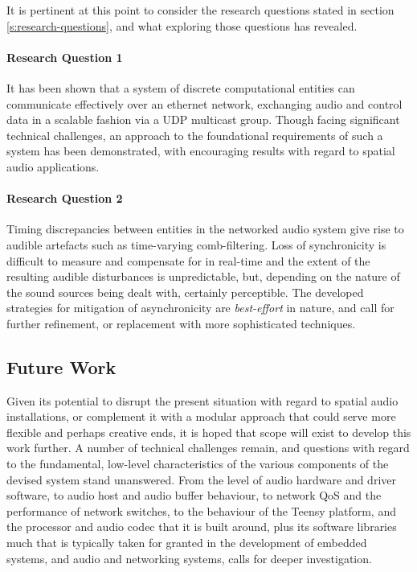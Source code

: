 It is pertinent at this point to consider the research questions stated in
section \ref{s:research-questions}, and what exploring those questions has
revealed.

\paragraph{Research Question 1}
It has been shown that a system of discrete computational entities can
communicate effectively over an ethernet network, exchanging audio and control
data in a scalable fashion via a UDP multicast group.
Though facing significant technical challenges, an approach to the foundational
requirements of such a system has been demonstrated, with encouraging results
with regard to spatial audio applications.

\paragraph{Research Question 2}
Timing discrepancies between entities in the networked audio system give rise
to audible artefacts such as time-varying comb-filtering.
Loss of synchronicity is difficult to measure and compensate for in real-time
and the extent of the resulting audible disturbances is unpredictable, but,
depending on the nature of the sound sources being dealt with,
certainly perceptible.
The developed strategies for mitigation of asynchronicity are
\textit{best-effort} in nature, and call for further refinement, or replacement
with more sophisticated techniques.

\subsection{Future Work}\label{subsec:future-work}

Given its potential to disrupt the present situation with regard to spatial
audio installations, or complement it with a modular approach that could serve
more flexible and perhaps creative ends, it is hoped that scope will exist to
develop this work further.
A number of technical challenges remain, and questions with regard to the
fundamental, low-level characteristics of the various components of the devised
system stand unanswered.
From the level of audio hardware and driver software, to audio host and audio
buffer behaviour, to network QoS and the performance of network switches, to
the behaviour of the Teensy platform, and the processor and audio codec that it
is built around, plus its software libraries \textemdash{} much that is
typically taken for granted in the development of embedded systems, and audio
and networking systems, calls for deeper investigation.

